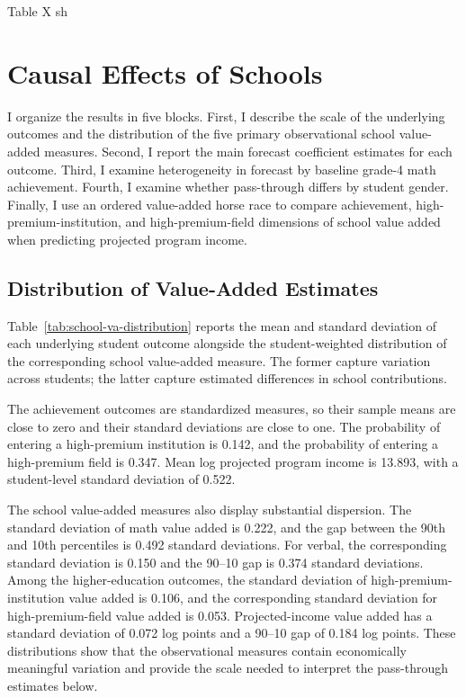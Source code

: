 \documentclass[a4paper, article, english, oneside, unknownkeysallowed, 12pt]{memoir}
\begin{document}






Table X sh




\clearpage 
\section{Causal Effects of Schools}

I organize the results in five blocks.
First, I describe the scale of the underlying outcomes and the distribution of the five primary observational school value-added measures.
Second, I report the main forecast coefficient estimates for each outcome.
Third, I examine heterogeneity in forecast by baseline grade-4 math achievement.
Fourth, I examine whether pass-through differs by student gender.
Finally, I use an ordered value-added horse race to compare achievement, high-premium-institution, and high-premium-field dimensions of school value added when predicting projected program income.

\subsection{Distribution of Value-Added Estimates}

Table~\ref{tab:school-va-distribution} reports the mean and standard deviation of each underlying student outcome alongside the student-weighted distribution of the corresponding school value-added measure.
The former capture variation across students; the latter capture estimated differences in school contributions.



The achievement outcomes are standardized measures, so their sample means are close to zero and their standard deviations are close to one.
The probability of entering a high-premium institution is 0.142, and the probability of entering a high-premium field is 0.347.
Mean log projected program income is 13.893, with a student-level standard deviation of 0.522.

The school value-added measures also display substantial dispersion.
The standard deviation of math value added is 0.222, and the gap between the 90th and 10th percentiles is 0.492 standard deviations.
For verbal, the corresponding standard deviation is 0.150 and the 90--10 gap is 0.374 standard deviations.
Among the higher-education outcomes, the standard deviation of high-premium-institution value added is 0.106, and the corresponding standard deviation for high-premium-field value added is 0.053.
Projected-income value added has a standard deviation of 0.072 log points and a 90--10 gap of 0.184 log points.
These distributions show that the observational measures contain economically meaningful variation and provide the scale needed to interpret the pass-through estimates below.
\end{document}
